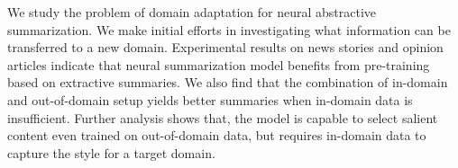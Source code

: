 We study the problem of domain adaptation for neural abstractive summarization. We make initial efforts in investigating what information can be transferred to a new domain. Experimental results on news stories and opinion articles indicate that neural summarization model benefits from pre-training based on extractive summaries. We also find that the combination of in-domain and out-of-domain setup yields better summaries when in-domain data is insufficient. Further analysis shows that, the model is capable to select salient content even trained on out-of-domain data, but requires in-domain data to capture the style for a target domain.
